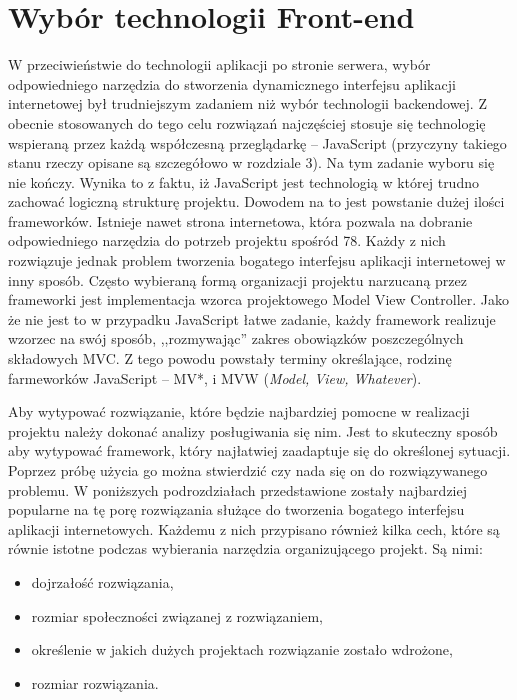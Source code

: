 \section{Wybór technologii Front-end}

W przeciwieństwie do technologii aplikacji po stronie serwera, wybór odpowiedniego narzędzia do stworzenia dynamicznego interfejsu aplikacji internetowej był trudniejszym zadaniem niż wybór technologii backendowej. Z obecnie stosowanych do tego celu rozwiązań najczęściej stosuje się technologię wspieraną przez każdą współczesną przeglądarkę -- JavaScript\cite{javascript-book} (przyczyny takiego stanu rzeczy opisane są szczegółowo w rozdziale 3). Na tym zadanie wyboru się nie kończy. Wynika to z faktu, iż JavaScript jest technologią w której trudno zachować logiczną strukturę projektu. Dowodem na to jest powstanie dużej ilości frameworków. Istnieje nawet strona internetowa, która pozwala na dobranie odpowiedniego narzędzia do potrzeb projektu spośród 78\cite{todomvc}. Każdy z nich rozwiązuje jednak problem tworzenia bogatego interfejsu aplikacji internetowej w inny sposób. Często wybieraną formą organizacji projektu narzucaną przez frameworki jest implementacja wzorca projektowego Model View Controller. Jako że nie jest to w przypadku JavaScript łatwe zadanie, każdy framework realizuje wzorzec na swój sposób, ,,rozmywając'' zakres obowiązków poszczególnych składowych MVC. Z tego powodu powstały terminy określające, rodzinę farmeworków JavaScript -- MV*, i MVW (\textit{Model, View, Whatever}). 

Aby wytypować rozwiązanie, które będzie najbardziej pomocne w realizacji projektu należy dokonać analizy posługiwania się nim. Jest to skuteczny sposób aby wytypować framework, który najłatwiej zaadaptuje się do określonej sytuacji\cite{todomvc}. Poprzez próbę użycia go można stwierdzić czy nada się on do rozwiązywanego problemu. 
W poniższych podrozdziałach przedstawione zostały najbardziej popularne na tę porę rozwiązania służące do tworzenia bogatego interfejsu aplikacji internetowych. Każdemu z nich przypisano również kilka cech, które są równie istotne podczas wybierania narzędzia organizującego projekt. Są nimi:
\begin{itemize}
\item dojrzałość rozwiązania,
\item rozmiar społeczności związanej z rozwiązaniem,
\item określenie w jakich dużych projektach rozwiązanie zostało wdrożone,
\item rozmiar rozwiązania.
\end{itemize}

